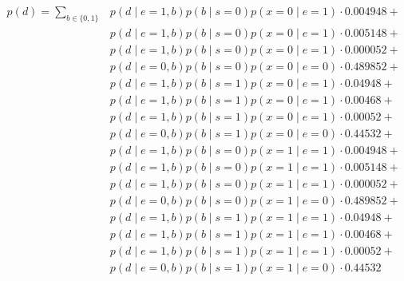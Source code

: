 \documentclass[12pt]{report}
\begin{document}
\begin{align*}    
    p(d) = \sum_{b \in \{0,1\}}  
        &p(d\mid e=1,b)p(b\mid s=0)p(x = 0 \mid e=1) \cdot 0.004948 + \\
        &p(d\mid e=1,b)p(b\mid s=0)p(x = 0 \mid e=1) \cdot 0.005148 + \\ 
        &p(d\mid e=1,b)p(b\mid s=0)p(x = 0 \mid e=1) \cdot 0.000052 + \\
        &p(d\mid e=0,b)p(b\mid s=0)p(x = 0 \mid e=0) \cdot 0.489852 + \\        
        &p(d\mid e=1,b)p(b\mid s=1)p(x = 0 \mid e=1) \cdot 0.04948 + \\
        &p(d\mid e=1,b)p(b\mid s=1)p(x = 0 \mid e=1) \cdot 0.00468 + \\ 
        &p(d\mid e=1,b)p(b\mid s=1)p(x = 0 \mid e=1) \cdot 0.00052 + \\
        &p(d\mid e=0,b)p(b\mid s=1)p(x = 0 \mid e=0) \cdot 0.44532 + \\
        &p(d\mid e=1,b)p(b\mid s=0)p(x = 1 \mid e=1) \cdot 0.004948 + \\
        &p(d\mid e=1,b)p(b\mid s=0)p(x = 1 \mid e=1) \cdot 0.005148 + \\ 
        &p(d\mid e=1,b)p(b\mid s=0)p(x = 1 \mid e=1) \cdot 0.000052 + \\
        &p(d\mid e=0,b)p(b\mid s=0)p(x = 1 \mid e=0) \cdot 0.489852 + \\        
        &p(d\mid e=1,b)p(b\mid s=1)p(x = 1 \mid e=1) \cdot 0.04948 + \\
        &p(d\mid e=1,b)p(b\mid s=1)p(x = 1 \mid e=1) \cdot 0.00468 + \\ 
        &p(d\mid e=1,b)p(b\mid s=1)p(x = 1 \mid e=1) \cdot 0.00052 + \\
        &p(d\mid e=0,b)p(b\mid s=1)p(x = 1 \mid e=0) \cdot 0.44532
\end{align*}
\end{document}

